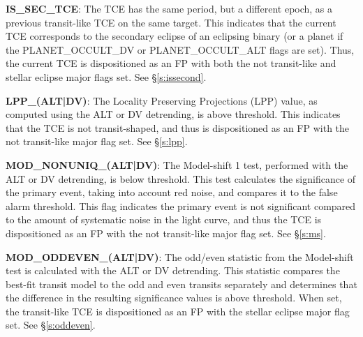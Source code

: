 \textbf{IS\_SEC\_TCE}: The TCE has the same period, but a different epoch, as a previous transit-like TCE on the same target. This indicates that the current TCE corresponds to the secondary eclipse of an eclipsing binary (or a planet if the PLANET\_OCCULT\_DV or PLANET\_OCCULT\_ALT flags are set). Thus, the current TCE is dispositioned as an FP with both the not transit-like and stellar eclipse major flags set. See \S\ref{s:issecond}.

\textbf{LPP\_(ALT|DV)}: The Locality Preserving Projections (LPP) value\citet{Thompson2015b}, as computed using the ALT or DV detrending, is above threshold. This indicates that the TCE is not transit-shaped, and thus is dispositioned as an FP with the not transit-like major flag set. See \S\ref{s:lpp}.


\textbf{MOD\_NONUNIQ\_(ALT|DV)}: The Model-shift 1 test, performed with the ALT or DV detrending, is below threshold. This test calculates the significance of the primary event, taking into account red noise, and compares it to the false alarm threshold. This flag indicates the primary event is not significant compared to the amount of systematic noise in the light curve, and thus the TCE is dispositioned as an FP with the not transit-like major flag set. See \S\ref{s:ms}.


\textbf{MOD\_ODDEVEN\_(ALT|DV)}: The odd/even statistic from the Model-shift test is calculated with the ALT or DV detrending. This statistic compares the best-fit transit model to the odd and even transits separately and determines that the difference in the resulting significance values is above threshold. When set, the transit-like TCE is dispositioned as an FP with the stellar eclipse major flag set. See \S\ref{s:oddeven}.

